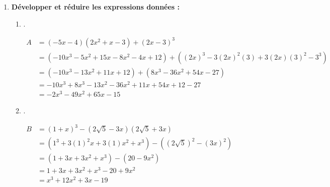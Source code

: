 \documentclass[12pt,a4paper]{article}
\begin{document}
\begin{enumerate}
\item \textbf{Développer et réduire les expressions données :}
\begin{enumerate}
\item .

$\begin{aligned}
A &= (-5x - 4)(2x^2 + x - 3) + (2x - 3)^3 \\[0.5em]
  &= (-10x^3 - 5x^2 + 15x - 8x^2 - 4x + 12) + \left((2x)^3 - 3(2x)^2(3) + 3(2x)(3)^2 - 3^3\right) \\[0.5em]
  &= (-10x^3 - 13x^2 + 11x + 12) + (8x^3 - 36x^2 + 54x - 27) \\[0.5em]
  &= -10x^3 + 8x^3 - 13x^2 - 36x^2 + 11x + 54x + 12 - 27 \\[0.5em]
  &= -2x^3 - 49x^2 + 65x - 15
\end{aligned}$

\item .

$\begin{aligned}
B &= (1 + x)^3 - (2\sqrt{5} - 3x)(2\sqrt{5} + 3x) \\[0.5em]
  &= (1^3 + 3(1)^2x + 3(1)x^2 + x^3) - \left((2\sqrt{5})^2 - (3x)^2\right) \\[0.5em]
  &= (1 + 3x + 3x^2 + x^3) - (20 - 9x^2) \\[0.5em]
  &= 1 + 3x + 3x^2 + x^3 - 20 + 9x^2 \\[0.5em]
  &= x^3 + 12x^2 + 3x - 19
\end{aligned}$

\end{enumerate}
\end{enumerate}
\end{document}
